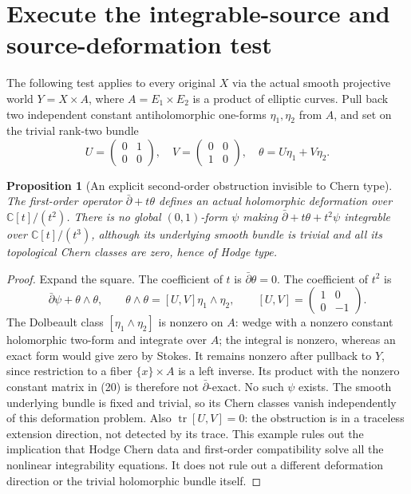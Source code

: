 \documentclass[11pt]{article}
\newtheorem{proposition}[theorem]{Proposition}
\begin{document}
\section{Execute the integrable-source and source-deformation test}
The following test applies to every original $X$ via the actual smooth
projective world $Y=X\times A$, where $A=E_1\times E_2$ is a product of
elliptic curves. Pull back two independent constant antiholomorphic
one-forms $\eta_1,\eta_2$ from $A$, and set on the trivial rank-two bundle
\[
 U=\begin{pmatrix}0&1\\0&0\end{pmatrix},\quad
 V=\begin{pmatrix}0&0\\1&0\end{pmatrix},\quad
 \theta=U\eta_1+V\eta_2.                              \tag{19}
\]
\begin{proposition}[An explicit second-order obstruction invisible to Chern type]
The first-order operator $\bar\partial+t\theta$ defines an actual
holomorphic deformation over $\mathbb C[t]/(t^2)$. There is no global
$(0,1)$-form $\psi$ making $\bar\partial+t\theta+t^2\psi$ integrable
over $\mathbb C[t]/(t^3)$, although its underlying smooth bundle is trivial
and all its topological Chern classes are zero, hence of Hodge type.
\end{proposition}
\begin{proof}
Expand the square. The coefficient of $t$ is $\bar\partial\theta=0$.
The coefficient of $t^2$ is
\[
 \bar\partial\psi+\theta\wedge\theta,
 \qquad \theta\wedge\theta=[U,V]\eta_1\wedge\eta_2,
 \qquad [U,V]=\begin{pmatrix}1&0\\0&-1\end{pmatrix}.  \tag{20}
\]
The Dolbeault class $[\eta_1\wedge\eta_2]$ is nonzero on $A$:
wedge with a nonzero constant holomorphic two-form and integrate over
$A$; the integral is nonzero, whereas an exact form would give zero by
Stokes. It remains nonzero after pullback to $Y$, since restriction to
a fiber $\{x\}\times A$ is a left inverse. Its product with the nonzero
constant matrix in (20) is therefore not $\bar\partial$-exact.
No such $\psi$ exists. The smooth underlying bundle is fixed and trivial,
so its Chern classes vanish independently of this deformation problem.
Also $\operatorname{tr}[U,V]=0$: the obstruction is in a traceless
extension direction, not detected by its trace. This example rules out
the implication that Hodge Chern data and first-order compatibility solve
all the nonlinear integrability equations. It does not rule out a
different deformation direction or the trivial holomorphic bundle itself.
\end{proof}
\end{document}
